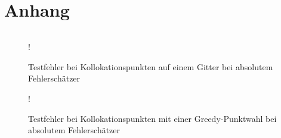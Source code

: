 \chapter{Anhang}
\label{cha:Anhang}

$\mbox{}$

%





\begin{figure}[H]
	\centering
	\resizebox {.8\columnwidth} {!} {
		
	}
	\caption{Testfehler bei Kollokationspunkten auf einem Gitter bei absolutem Fehlerschätzer}
	\label{fig:abs-error-grid-both}
\end{figure}

\begin{figure}[H]
	\centering
	\resizebox {.8\columnwidth} {!} {
		
	}
	\caption{Testfehler bei Kollokationspunkten mit einer Greedy-Punktwahl bei absolutem Fehlerschätzer}
	\label{fig:abs-error-greedy-both}
\end{figure}